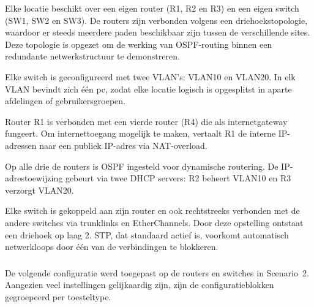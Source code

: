 \vspace{0.3cm}

Elke locatie beschikt over een eigen router (R1, R2 en R3) en een eigen switch (SW1, SW2 en SW3). De routers zijn verbonden volgens een driehoekstopologie, waardoor er steeds meerdere paden beschikbaar zijn tussen de verschillende sites. Deze topologie is opgezet om de werking van OSPF-routing binnen een redundante netwerkstructuur te demonstreren.

\vspace{0.3cm}

Elke switch is geconfigureerd met twee VLAN’s: VLAN10 en VLAN20. In elk VLAN bevindt zich één pc, zodat elke locatie logisch is opgesplitst in aparte afdelingen of gebruikersgroepen.

\vspace{0.3cm}

Router R1 is verbonden met een vierde router (R4) die als internetgateway fungeert. Om internettoegang mogelijk te maken, vertaalt R1 de interne IP-adressen naar een publiek IP-adres via NAT-overload.

\vspace{0.3cm}

Op alle drie de routers is OSPF ingesteld voor dynamische routering. De IP-adrestoewijzing gebeurt via twee DHCP servers: R2 beheert VLAN10 en R3 verzorgt VLAN20.


\vspace{0.3cm}

Elke switch is gekoppeld aan zijn router en ook rechtstreeks verbonden met de andere switches via trunklinks en EtherChannels. Door deze opstelling ontstaat een driehoek op laag 2. STP, dat standaard actief is, voorkomt automatisch netwerkloops door één van de verbindingen te blokkeren.


\subsubsection{}
\label{sec:configuratie-PacketTracer}

De volgende configuratie werd toegepast op de routers en switches in Scenario~2. Aangezien veel instellingen gelijkaardig zijn, zijn de configuratieblokken gegroepeerd per toesteltype.

\vspace{0.3cm}

